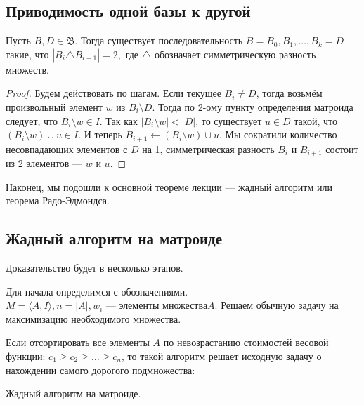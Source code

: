 \documentclass[a4paper, 12pt]{article}
\begin{document}
\subsection{Приводимость одной базы к другой}

\begin{Lemma}
  Пусть $B, D \in \mathfrak{B}$. Тогда существует последовательность $B = B_0, B_1,
  \ldots, B_k = D$ такие, что $|B_i \triangle B_{i + 1}| = 2,$ где $\triangle$
  обозначает симметрическую разность множеств.
\end{Lemma}

\begin{proof}
  Будем действовать по шагам. Если текущее $B_i \neq D$, тогда возьмём 
  произвольный элемент
  $w$ из $B_i \setminus D$. Тогда по 2-ому пункту определения матроида следует,
  что $B_i \setminus w \in I$. Так как $|B_i \setminus w| < |D|$, то существует
  $u \in D$ такой, что $(B_i \setminus w) \cup u \in I$. И теперь $B_{i + 1} 
  \gets (B_i \setminus w) \cup u$.
  Мы сократили количество несовпадающих элементов с $D$ на 1, симметрическая
  разность $B_i$ и $B_{i + 1}$ состоит из 2 элементов --- $w$ и $u$.
\end{proof}

Наконец, мы подошли к основной теореме лекции --- жадный алгоритм или теорема
Радо-Эдмондса.

\subsection{Жадный алгоритм на матроиде}

Доказательство будет в несколько этапов.

Для начала определимся с обозначениями. $M = \langle A, I \rangle, n = |A|, w_i
\text{ --- элементы множества} A$.
Решаем обычную задачу на максимизацию необходимого множества.

\begin{Theorem}
  Если отсортировать все элементы $A$ по невозрастанию стоимостей весовой функции:
  $c_1 \geqslant c_2 \geqslant \ldots \geqslant c_n$, то такой алгоритм решает
  исходную задачу о нахождении самого дорогого подмножества:
  
  \rm{
  \begin{algorithm}
  \caption{Жадный алгоритм на матроиде.}
    \begin{algorithmic}
        \EndIf
      \EndFor
    \end{algorithmic}
  \end{algorithm}
  }
\end{Theorem}
\end{document}
